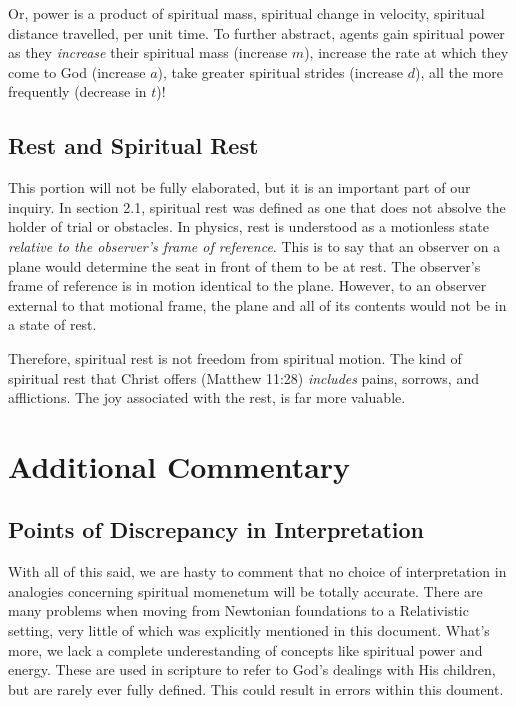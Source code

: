 \documentclass{article}
\begin{document}
                Or, power is a product of spiritual mass, spiritual change in velocity, spiritual distance travelled, per unit time.
                To further abstract, agents gain spiritual power as they \emph{increase} their spiritual mass (increase $m$), increase the rate at which they come to God (increase $a$), take greater spiritual strides (increase $d$), all the more frequently (decrease in $t$)!
                
            \subsection{Rest and Spiritual Rest}
                This portion will not be fully elaborated, but it is an important part of our inquiry.
                In section 2.1, spiritual rest was defined as one that does not absolve the holder of trial or obstacles. 
                In physics, rest is understood as a motionless state \emph{relative to the observer's frame of reference}. This is to say that an observer on a plane would determine the seat in front of them to be at rest. 
                The observer's frame of reference is in motion identical to the plane. However, to an observer external to that motional frame, the plane and all of its contents would not be in a state of rest.

                Therefore, spiritual rest is not freedom from spiritual motion. The kind of spiritual rest that Christ offers (Matthew 11:28) \emph{includes} pains, sorrows, and afflictions. The joy associated with the rest, is far more valuable. 
\newpage

    \section{Additional Commentary}
            \subsection{Points of Discrepancy in Interpretation}
                With all of this said, we are hasty to comment that no choice of interpretation in analogies concerning spiritual momenetum will be totally accurate. 
                There are many problems when moving from Newtonian foundations to a Relativistic setting, very little of which was explicitly mentioned in this document. 
                What's more, we lack a complete underestanding of concepts like spiritual power and energy. These are used in scripture to refer to God's dealings with His children, but are rarely ever fully defined. 
                This could result in errors within this doument.
\end{document}
